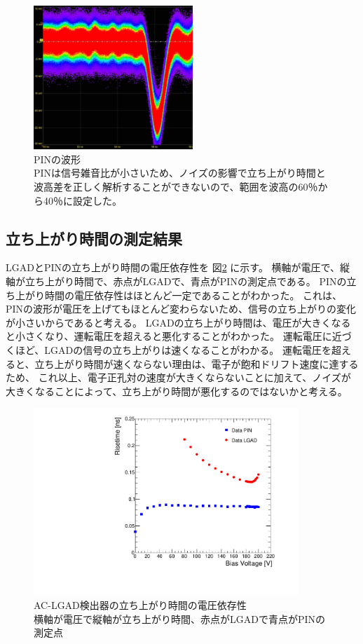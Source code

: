 \begin{figure}[h]
    \centering
    \includegraphics[width=6cm]{fig/ch5/PIN_波形_12.6.jpg}
    \caption[PINの波形]{PINの波形\\PINは信号雑音比が小さいため、ノイズの影響で立ち上がり時間と波高差を正しく解析することができないので、範囲を波高の60％から40％に設定した。}
    \label{fg:RiseTime_analysis}
\end{figure}

\subsection{立ち上がり時間の測定結果}
LGADとPINの立ち上がり時間の電圧依存性を 図\ref{fg:RiseTimevsBias} に示す。
横軸が電圧で、縦軸が立ち上がり時間で、赤点がLGADで、青点がPINの測定点である。
PINの立ち上がり時間の電圧依存性はほとんど一定であることがわかった。
これは、PINの波形が電圧を上げてもほとんど変わらないため、信号の立ち上がりの変化が小さいからであると考える。
LGADの立ち上がり時間は、電圧が大きくなると小さくなり、運転電圧を超えると悪化することがわかった。
運転電圧に近づくほど、LGADの信号の立ち上がりは速くなることがわかる。
運転電圧を超えると、立ち上がり時間が速くならない理由は、電子が飽和ドリフト速度に達するため、
これ以上、電子正孔対の速度が大きくならないことに加えて、ノイズが大きくなることによって、立ち上がり時間が悪化するのではないかと考える。

\begin{figure}[h]
    \centering
    \includegraphics[width=10cm]{fig/graph/RisetimevsVoltage.pdf}
    \caption[AC-LGAD検出器の立ち上がり時間の電圧依存性]{AC-LGAD検出器の立ち上がり時間の電圧依存性\\横軸が電圧で縦軸が立ち上がり時間、赤点がLGADで青点がPINの測定点}
    \label{fg:RiseTimevsBias}
\end{figure}

